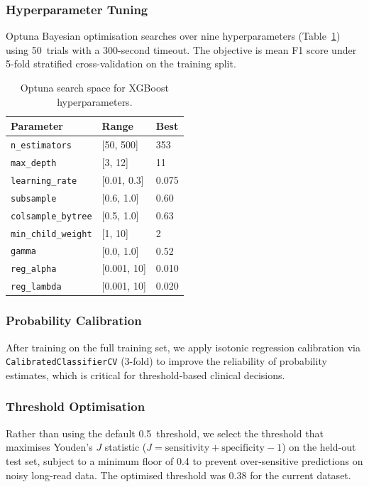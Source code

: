 \documentclass[11pt,twocolumn]{article}
\begin{document}
\subsubsection{Hyperparameter Tuning}
Optuna Bayesian optimisation searches over nine hyperparameters
(Table~\ref{tab:hyperparams}) using 50~trials with a 300-second
timeout.  The objective is mean F1 score under 5-fold stratified
cross-validation on the training split.

\begin{table}[t]
\centering
\caption{Optuna search space for XGBoost hyperparameters.}
\label{tab:hyperparams}
\begin{tabular}{@{}lll@{}}
\toprule
\textbf{Parameter} & \textbf{Range} & \textbf{Best} \\
\midrule
\texttt{n\_estimators} & [50, 500] & 353 \\
\texttt{max\_depth} & [3, 12] & 11 \\
\texttt{learning\_rate} & [0.01, 0.3] & 0.075 \\
\texttt{subsample} & [0.6, 1.0] & 0.60 \\
\texttt{colsample\_bytree} & [0.5, 1.0] & 0.63 \\
\texttt{min\_child\_weight} & [1, 10] & 2 \\
\texttt{gamma} & [0.0, 1.0] & 0.52 \\
\texttt{reg\_alpha} & [0.001, 10] & 0.010 \\
\texttt{reg\_lambda} & [0.001, 10] & 0.020 \\
\bottomrule
\end{tabular}
\end{table}

\subsubsection{Probability Calibration}
After training on the full training set, we apply isotonic regression
calibration via \texttt{CalibratedClassifierCV} (3-fold) to improve
the reliability of probability estimates, which is critical for
threshold-based clinical decisions.

\subsubsection{Threshold Optimisation}
Rather than using the default 0.5~threshold, we select the threshold
that maximises Youden's $J$ statistic ($J = \text{sensitivity} +
\text{specificity} - 1$) on the held-out test set, subject to a
minimum floor of 0.4 to prevent over-sensitive predictions on noisy
long-read data.  The optimised threshold was 0.38 for the current
dataset.
\end{document}
